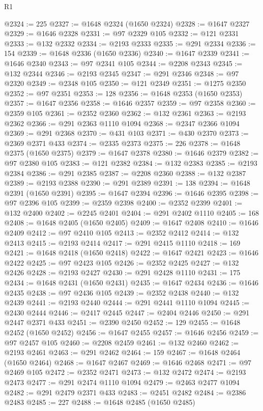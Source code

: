 \begin{lexlean}{R1}
\begin{coremodule}
@2324 := 225
@2327 := @1648 @2324 (@1650 @2324)
@2328 := @1647 @2327
@2329 := @1646 @2328
@2331 := @97 @2329 @105
@2332 := @121 @2331
@2333 := @132 @2332
@2334 := @2193 @2333
@2335 := @291 @2334
@2336 := 154
@2339 := @1648 @2336 (@1650 @2336)
@2340 := @1647 @2339
@2341 := @1646 @2340
@2343 := @97 @2341 @105
@2344 := @2208 @2343
@2345 := @132 @2344
@2346 := @2193 @2345
@2347 := @291 @2346
@2348 := @97 @2320
@2349 := @2348 @105
@2350 := @121 @2349
@2351 := @1275 @2350
@2352 := @97 @2351
@2353 := 128
@2356 := @1648 @2353 (@1650 @2353)
@2357 := @1647 @2356
@2358 := @1646 @2357
@2359 := @97 @2358
@2360 := @2359 @105
@2361 := @2352 @2360
@2362 := @132 @2361
@2363 := @2193 @2362
@2366 := @291 @2363 @1110 @1094
@2368 := @2347 @2366 @1094
@2369 := @291 @2368
@2370 := @431 @103
@2371 := @430 @2370
@2373 := @2369 @2371 @433
@2374 := @2335 @2373
@2375 := 226
@2378 := @1648 @2375 (@1650 @2375)
@2379 := @1647 @2378
@2380 := @1646 @2379
@2382 := @97 @2380 @105
@2383 := @121 @2382
@2384 := @132 @2383
@2385 := @2193 @2384
@2386 := @291 @2385
@2387 := @2208 @2360
@2388 := @132 @2387
@2389 := @2193 @2388
@2390 := @291 @2389
@2391 := 138
@2394 := @1648 @2391 (@1650 @2391)
@2395 := @1647 @2394
@2396 := @1646 @2395
@2398 := @97 @2396 @105
@2399 := @2359 @2398
@2400 := @2352 @2399
@2401 := @132 @2400
@2402 := @2245 @2401
@2404 := @291 @2402 @1110
@2405 := 168
@2408 := @1648 @2405 (@1650 @2405)
@2409 := @1647 @2408
@2410 := @1646 @2409
@2412 := @97 @2410 @105
@2413 := @2352 @2412
@2414 := @132 @2413
@2415 := @2193 @2414
@2417 := @291 @2415 @1110
@2418 := 169
@2421 := @1648 @2418 (@1650 @2418)
@2422 := @1647 @2421
@2423 := @1646 @2422
@2425 := @97 @2423 @105
@2426 := @2352 @2425
@2427 := @132 @2426
@2428 := @2193 @2427
@2430 := @291 @2428 @1110
@2431 := 175
@2434 := @1648 @2431 (@1650 @2431)
@2435 := @1647 @2434
@2436 := @1646 @2435
@2438 := @97 @2436 @105
@2439 := @2352 @2438
@2440 := @132 @2439
@2441 := @2193 @2440
@2444 := @291 @2441 @1110 @1094
@2445 := @2430 @2444
@2446 := @2417 @2445
@2447 := @2404 @2446
@2450 := @291 @2447 @2371 @433
@2451 := @2390 @2450
@2452 := 129
@2455 := @1648 @2452 (@1650 @2452)
@2456 := @1647 @2455
@2457 := @1646 @2456
@2459 := @97 @2457 @105
@2460 := @2208 @2459
@2461 := @132 @2460
@2462 := @2193 @2461
@2463 := @291 @2462
@2464 := 159
@2467 := @1648 @2464 (@1650 @2464)
@2468 := @1647 @2467
@2469 := @1646 @2468
@2471 := @97 @2469 @105
@2472 := @2352 @2471
@2473 := @132 @2472
@2474 := @2193 @2473
@2477 := @291 @2474 @1110 @1094
@2479 := @2463 @2477 @1094
@2482 := @291 @2479 @2371 @433
@2483 := @2451 @2482
@2484 := @2386 @2483
@2485 := 227
@2488 := @1648 @2485 (@1650 @2485)

\end{coremodule}
\end{lexlean}
